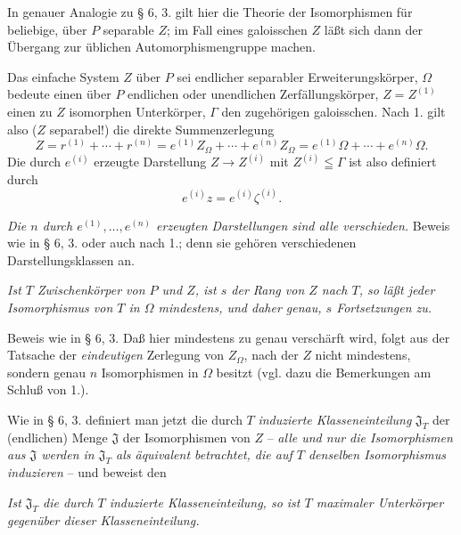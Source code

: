 \medskip
\noindent\textbf{}\quad In genauer Analogie zu § 6, 3. gilt hier die Theorie der Isomorphismen für beliebige, über \(P\) separable \(Z\); im Fall eines galoisschen \(Z\) läßt sich dann der Übergang zur üblichen Automorphismengruppe machen.

\medskip
\noindent\textbf{}\quad Das einfache System \(Z\) über \(P\) sei endlicher separabler Erweiterungskörper, \(\Omega\) bedeute einen über \(P\) endlichen oder unendlichen Zerfällungskörper, \(Z=Z^{(1)}\) einen zu \(Z\) isomorphen Unterkörper, \(\Gamma\) den zugehörigen galoisschen. Nach 1. gilt also (\(Z\) separabel!) die direkte Summenzerlegung
\[
        Z=r^{(1)}+\cdots+r^{(n)}
        =e^{(1)}Z_\Omega+\cdots+e^{(n)}Z_\Omega
        =e^{(1)}\Omega+\cdots+e^{(n)}\Omega .
\]
Die durch \(e^{(i)}\) erzeugte Darstellung \(Z\to Z^{(i)}\) mit \(Z^{(i)}\leqq\Gamma\) ist also definiert durch
\[
        e^{(i)}z=e^{(i)}\zeta^{(i)}.
\]

\noindent\textbf{} \emph{Die \(n\) durch \(e^{(1)},\ldots,e^{(n)}\) erzeugten Darstellungen sind alle verschieden.} Beweis wie in § 6, 3. oder auch nach 1.; denn sie gehören verschiedenen Darstellungsklassen an.

\noindent\textbf{} \emph{Ist \(T\) Zwischenkörper von \(P\) und \(Z\), ist \(s\) der Rang von \(Z\) nach \(T\), so läßt jeder Isomorphismus von \(T\) in \(\Omega\) mindestens, und daher genau, \(s\) Fortsetzungen zu.}

Beweis wie in § 6, 3. Daß hier mindestens zu genau verschärft wird, folgt aus der Tatsache der \emph{eindeutigen} Zerlegung von \(Z_\Omega\), nach der \(Z\) nicht mindestens, sondern genau \(n\) Isomorphismen in \(\Omega\) besitzt (vgl. dazu die Bemerkungen am Schluß von 1.).

Wie in § 6, 3. definiert man jetzt die durch \(T\) \emph{induzierte Klasseneinteilung} \(\mathfrak J_T\) der (endlichen) Menge \(\mathfrak J\) der Isomorphismen von \(Z\) -- \emph{alle und nur die Isomorphismen aus \(\mathfrak J\) werden in \(\mathfrak J_T\) als äquivalent betrachtet, die auf \(T\) denselben Isomorphismus induzieren} -- und beweist den

\noindent\textbf{} \emph{Ist \(\mathfrak J_T\) die durch \(T\) induzierte Klasseneinteilung, so ist \(T\) maximaler Unterkörper gegenüber dieser Klasseneinteilung.}

